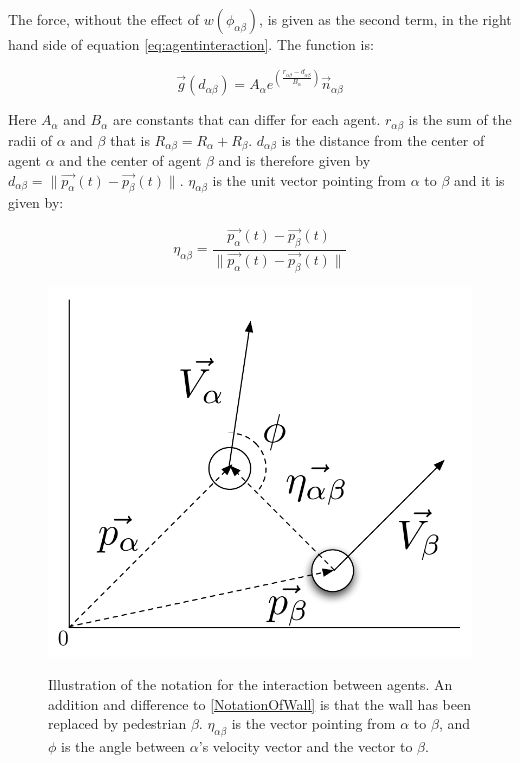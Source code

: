 
The force, without the effect of $w\left(\phi_{\alpha \beta}\right)$, is given as the second term, in the right hand side of equation \ref{eq:agentinteraction}. The function is:  

\begin{equation}
	\vec{g} 
	\left(
	d_{\alpha \beta}
	\right)
	=
	 A_{\alpha} e^{ \left(\frac{ r_{\alpha \beta} - d_{\alpha \beta}}{B_{\alpha}}\right)}
	\vec{n}_{\alpha \beta}
	        \label{re}	
\end{equation}

Here $A_{\alpha}$ and $B_{\alpha}$ are constants that can differ for each agent. 
$r_{\alpha \beta}$ is the sum of the radii of $\alpha$ and $\beta$ that is 
$R_{\alpha \beta} = R_{\alpha} + R_{\beta}$. $d_{\alpha \beta}$ is the 
distance from the center of agent $\alpha$ and the center of 
agent $\beta$ and is therefore given by $d_{\alpha \beta} = 
\|\vec{p_{\alpha}}\left( t \right) - \vec{p_{\beta}}\left( t \right) \|$.
$\eta_{\alpha \beta}$ is the unit vector pointing from $\alpha$ to $\beta$ 
and it is given by:

\begin{equation}
    \eta_{\alpha \beta} =
        \frac{\vec{p_{\alpha}}(t) - \vec{p_{\beta}}(t)}
             {\|\vec{p_{\alpha}}(t) - \vec{p_{\beta}}(t) \|}
\end{equation}

\begin{figure}[ht]
    \centering
    {\includegraphics[scale=0.35]{Figures/NotationOfInteraction.pdf}} 
    \caption[Notation of the interaction between two agents]{Illustration of the notation for the interaction between agents.
	     An addition and difference to \ref{NotationOfWall} is that the wall has been replaced by pedestrian $\beta$.
	     $\eta_{\alpha \beta}$ is the vector pointing from $\alpha$ to $\beta$, and $\phi$ is the angle between $\alpha$'s 
	     velocity vector and the vector to $\beta$.}
    \label{fig:NotationOfInteraction}
\end{figure}


